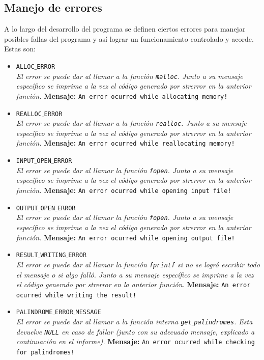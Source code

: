 \documentclass[a4paper, 10pt]{article}
\def\code#1{\texttt{#1}}
\begin{document}
		\subsection{Manejo de errores}
			A lo largo del desarrollo del programa se definen ciertos errores para manejar posibles fallas del
			programa y así lograr un funcionamiento controlado y acorde. Estas son:
			\begin{itemize}
			
				\item \code{ALLOC$\_$ERROR}
				\\\textit{El error se puede dar al llamar a la función \code{malloc}.
				Junto a su mensaje específico se imprime a la vez el código generado por strerror en
				la anterior función.}
					\subitem \textbf{Mensaje:} 
						\subsubitem \code{An error ocurred while allocating memory!}
					
				\item \code{REALLOC$\_$ERROR}
				\\\textit{El error se puede dar al llamar a la función \code{realloc}.
				Junto a su mensaje específico se imprime a la vez el código generado por strerror en
				la anterior función.}
					\subitem \textbf{Mensaje:} 
						\subsubitem \code{An error ocurred while reallocating memory!}
								
				\item \code{INPUT$\_$OPEN$\_$ERROR}
				\\\textit{El error se puede dar al llamar la función \code{fopen}.
				Junto a su mensaje específico se imprime a la vez el código generado por strerror en
				la anterior función.}
					\subitem \textbf{Mensaje:} 
						\subsubitem \code{An error ocurred while opening input file!}				
				
				\item \code{OUTPUT$\_$OPEN$\_$ERROR}
				\\\textit{El error se puede dar al llamar la función \code{fopen}.
				Junto a su mensaje específico se imprime a la vez el código generado por strerror en
				la anterior función.}
					\subitem \textbf{Mensaje:} 
						\subsubitem \code{An error ocurred while opening output file!}
						
				\item \code{RESULT$\_$WRITING$\_$ERROR}
				\\\textit{El error se puede dar al llamar la función \code{fprintf}
				si no se logró escribir todo el mensaje o si algo falló.
				Junto a su mensaje específico se imprime a la vez el código generado por strerror en
				la anterior función.}
					\subitem \textbf{Mensaje:} 
						\subsubitem \code{An error ocurred while writing the result!}
						
				\item \code{PALINDROME$\_$ERROR$\_$MESSAGE}
				\\\textit{El error se puede dar al llamar a la función interna \code{get$\_$palindromes}.
				Esta devuelve \code{NULL} en caso de fallar (junto con su adecuado mensaje, explicado
				a continuación en el informe).}
					\subitem \textbf{Mensaje:} 
						\subsubitem \code{An error ocurred while checking for palindromes!}																			
						
			\end{itemize}
\end{document}
